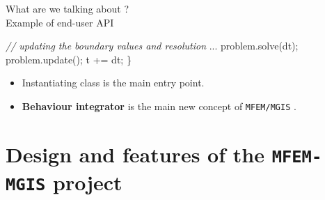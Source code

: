\documentclass{beamer}
\newcommand{\CommentTok}[1]{\textcolor[rgb]{0.38,0.63,0.69}{\textit{#1}}}
\newcommand{\NormalTok}[1]{#1}
\begin{document}
\begin{frame}[fragile]{What are we talking about ? \\
Example of end-user API}
\begin{center}
\begin{minipage}{\linewidth}
\begin{Highlighting}[]
        \CommentTok{  // updating the boundary values and resolution}
        \NormalTok{  ...}
        \NormalTok{  problem.solve(dt);}
        \NormalTok{  problem.update();}
        \NormalTok{  t += dt;}
        \NormalTok{\}}
      \end{Highlighting}
    \end{minipage}
  \end{center}
  \begin{itemize}
    \item Instantiating  class is the
    main entry point.
    \item \textbf{Behaviour integrator} is the main new
    concept of {\tt MFEM/MGIS} .
  \end{itemize}
\end{frame}

\section{Design and features of the \texttt{MFEM-MGIS} project}
\end{document}
